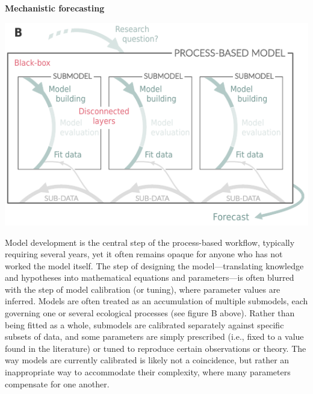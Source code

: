 \documentclass[11pt]{article}
\begin{document}
\begin{tcolorbox}
{\begin{multicols}{2}
\vfill

\columnbreak

\centerline{\bf Mechanistic forecasting}
\vspace*{2mm}
\begin{minipage}[t]{\linewidth}
    \includegraphics[width=\linewidth]{figures/forecasting_details}

    \vspace*{1mm}
\end{minipage}

\noindent %
Model development is the central step of the process-based workflow, typically requiring several years, yet it often remains opaque for anyone who has not worked the model itself. The step of designing the model---translating knowledge and hypotheses into mathematical equations and parameters---is often blurred with the step of model calibration (or tuning), where parameter values are inferred. Models are often treated as an accumulation of multiple submodels, each governing one or several ecological processes (see figure B above). Rather than being fitted as a whole, submodels are calibrated separately against specific subsets of data, and some parameters are simply prescribed (i.e., fixed to a value found in the literature) or tuned to reproduce certain observations or theory. The way models are currently calibrated is likely not a coincidence, but rather an inappropriate way to accommodate their complexity, where many parameters compensate for one another. 


\end{multicols}}
\end{tcolorbox}
\end{document}
